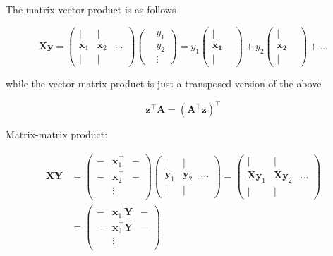 The matrix-vector product is as follows

\begin{equation}
	\mathbf{X}\mathbf{y} = 
	\left(
		\begin{smallmatrix}
			|& |& 							    \\
			\mathbf{x}_1 & \mathbf{x}_2 & \dots \\
			|& |& 
		\end{smallmatrix} 
	\right)
	\left(
		\begin{smallmatrix}
			&y_1 \\ &y_2 \\ &\vdots 
		\end{smallmatrix}
	\right) 
	= 
	y_1 \left(
		\begin{smallmatrix}
			|& \\
			\mathbf{x_1}& \\
			|&
		\end{smallmatrix}
		\right)
	+ y_2 \left(
		\begin{smallmatrix}
			|& \\
			\mathbf{x_2}& \\
			|&
		\end{smallmatrix}
		\right)
	+ \dots 
\end{equation}

while the vector-matrix product is just a transposed version of the above

\begin{equation}
	\mathbf{z}^{\top}\mathbf{A} = (\mathbf{A}^\top \mathbf{z})^\top 
\end{equation}

Matrix-matrix product:

\begin{align}
	\mathbf{X}\mathbf{Y} &=
	 	\left( 
		\begin{smallmatrix}
			-& \mathbf{x}_1^\top &-  \\
			-& \mathbf{x}_2^\top &-  \\
			 & \vdots & 			 \\
		\end{smallmatrix} 
		\right)
		\left(
			\begin{smallmatrix}
				|& |& 							    \\
				\mathbf{y}_1 & \mathbf{y}_2 & \dots \\
				|& |& 
			\end{smallmatrix} 
		\right) 
		= 
		\left(
			\begin{smallmatrix}
				|& |& 							    \\
				\mathbf{Xy}_1 & \mathbf{Xy}_2 & \dots \\
				|& |& 
			\end{smallmatrix} 
		\right)
		\\ 
		&=
		\left(
			\begin{smallmatrix}
				-& \mathbf{x}_1^\top \mathbf{Y} &-  \\
				-& \mathbf{x}_2^\top  \mathbf{Y}&-   \\
				 & \vdots & 			 \\
			\end{smallmatrix} 
		\right)
\end{align}	
